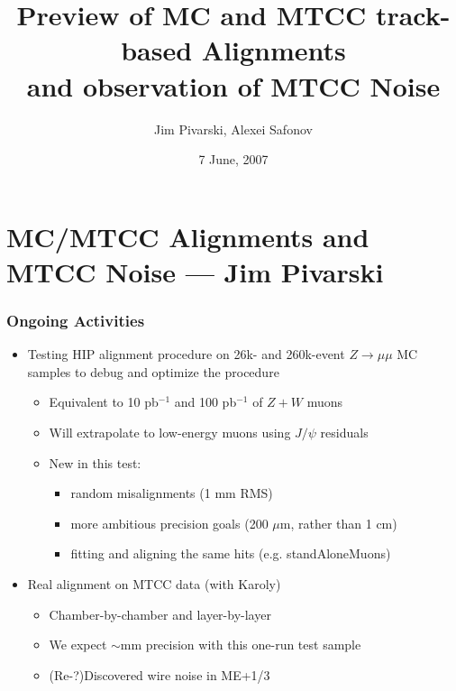 \documentclass[compress]{beamer}
\title{Preview of MC and MTCC track-based Alignments \\ and observation of MTCC Noise}
\author{Jim Pivarski, Alexei Safonov}
\institute{Texas A\&M University}
\date{ 7 June, 2007}
\begin{document}
\frame{\titlepage}
\section*{MC/MTCC Alignments and MTCC Noise --- Jim Pivarski}

\begin{frame}
\frametitle{Ongoing Activities}
\begin{itemize}\setlength{\itemsep}{0.5 cm}
\item Testing HIP alignment procedure on 26k- and 260k-event
  $Z\to\mu\mu$ MC samples to debug and optimize the procedure

\begin{itemize}\setlength{\itemsep}{0.2 cm}
\item Equivalent to 10 pb$^{-1}$ and 100 pb$^{-1}$ of $Z+W$ muons

\item Will extrapolate to low-energy muons using $J/\psi$ residuals

\item New in this test:
\begin{itemize}
\item random misalignments (1 mm RMS)
\item more ambitious precision goals (200 $\mu$m, rather than 1 cm)
\item fitting and aligning the same hits (e.g. standAloneMuons)
\end{itemize}
\end{itemize}

\item Real alignment on MTCC data (with Karoly)

\begin{itemize}\setlength{\itemsep}{0.2 cm}
\item Chamber-by-chamber and layer-by-layer

\item We expect $\sim$mm precision with this one-run test sample

\item (Re-?)Discovered wire noise in ME+1/3

\end{itemize}
\end{itemize}
\end{frame}
\end{document}
